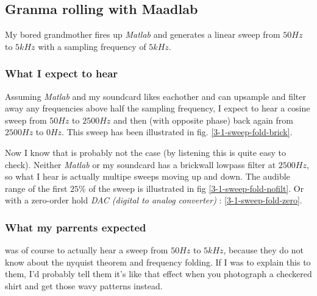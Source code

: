 \subsection{ Granma rolling with Maadlab }
My bored grandmother fires up \emph{Matlab} and generates a linear sweep from
$50Hz$ to $5kHz$ with a sampling frequency of $5kHz$.

\subsubsection{ What I  expect to hear }
Assuming \emph{Matlab} and my soundcard likes eachother and can upsample and
filter away any frequencies above half the sampling frequency, I expect to hear
a cosine sweep from $50Hz$ to $2500Hz$ and then (with opposite phase) back again
from $2500Hz$ to $0Hz$. This sweep has been illustrated in fig.
\ref{3-1-sweep-fold-brick}.


Now I know that is probably not the case (by listening this is quite easy to
check). Neither \emph{Matlab} or my soundcard has a brickwall lowpass filter at
$2500Hz$, so what I hear is actually multipe sweeps moving up and down. The
audible range of the first $25\%$ of the sweep is illustrated in fig
\ref{3-1-sweep-fold-nofilt}. Or with a zero-order hold \emph{DAC (digital to
analog converter)} :
\ref{3-1-sweep-fold-zero}.



\subsubsection{ What my parrents expected }
was of course to actually hear a sweep from $50Hz$ to $5kHz$, because they do
not know about the nyquist theorem and frequency folding. If I was to explain
this to them, I'd probably tell them it's like that effect when you photograph a
checkered shirt and get those wavy patterns instead.

